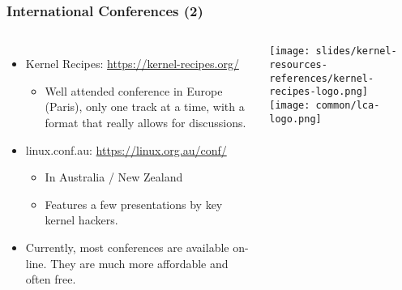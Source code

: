 \begin{frame}
  \frametitle{International Conferences (2)}
  \begin{columns}
    \begin{itemize}
      \item Kernel Recipes: \url{https://kernel-recipes.org/}
      \begin{itemize}
      \item Well attended conference in Europe (Paris), only one track
        at a time, with a format that really allows for discussions.
    \end{itemize}
    \item linux.conf.au: \url{https://linux.org.au/conf/}
      \begin{itemize}
      \item In Australia / New Zealand
      \item Features a few presentations by key kernel hackers.
      \end{itemize}
    \item Currently, most conferences are available on-line. They
	  are much more affordable and often free.
  \end{itemize}
     \texttt{[image: slides/kernel-resources-references/kernel-recipes-logo.png]}\\
     \vspace{1cm}
     \texttt{[image: common/lca-logo.png]}
  \end{columns}
\end{frame}

